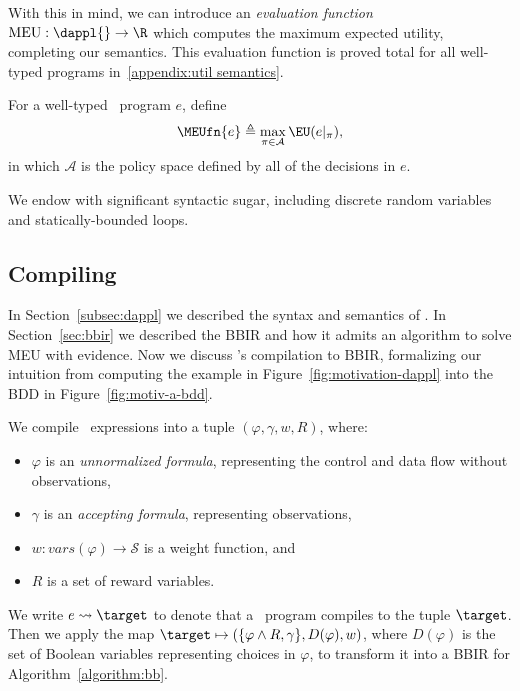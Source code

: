 With this in mind, we can introduce an \emph{evaluation function} $\mathrm{MEU}:
\dappl{} \to \R$ which computes the maximum expected utility, completing our
semantics. This evaluation function is proved total for all well-typed \dappl{}
programs in~\cref{appendix:util semantics}.

\begin{definition}\label{def:meu for dappl}
  For a well-typed \dappl~program $e$, define
  \begin{equation}\label{eq:meu for dappl}
    \MEUfn{e} \triangleq \max_{\pi \in \mathcal A} \EU(e|_{\pi}),
  \end{equation}
  in which $\mathcal A$ is the policy space defined by all of the decisions in $e$.
\end{definition}

We endow
\dappl{} with significant syntactic sugar, including
discrete random variables and statically-bounded loops.
\subsection{Compiling \dappl}
\label{subsec:compiling-dappl}

In Section~\ref{subsec:dappl} we described
the syntax and semantics of \dappl.
In Section~\ref{sec:bbir} we described the BBIR
and how it admits an algorithm to solve MEU with evidence.
Now we discuss \dappl{}'s compilation to BBIR, formalizing
our intuition from
computing the example in
Figure~\ref{fig:motivation-dappl} into
the BDD in Figure~\ref{fig:motiv-a-bdd}.

We compile \dappl~expressions into a tuple $(\varphi, \gamma, w, R)$, where:
\begin{itemize}[leftmargin=*]
  \item $\varphi$ is an \textit{unnormalized formula},
  representing the control and data flow without observations,
  \item $\gamma$ is an \textit{accepting formula},
  representing observations,
  \item $w: vars(\varphi) \to \mathcal S$ is a weight function, and
  \item $R$ is a set of reward variables.
\end{itemize}

We write $e \leadsto \target$
to denote that a \dappl~program compiles to the tuple $\target$.
Then we apply the map $\target \mapsto (\{\varphi \land R,\gamma\},  D(\varphi), w)$,
where $D(\varphi)$ is the set of Boolean variables representing choices in $\varphi$,
to transform it into a BBIR for Algorithm~\ref{algorithm:bb}.


